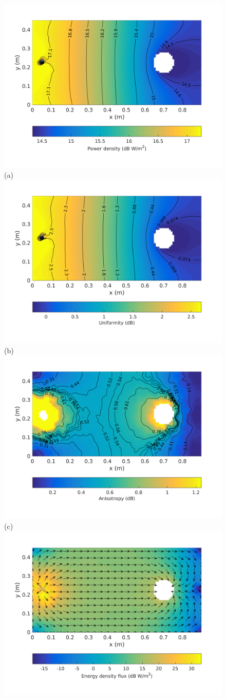 \documentclass[a4paper]{article}
\numberwithin{equation}{section}
\begin{document}
\begin{figure}[hp]
\begin{center}
\includegraphics[trim={0 8mm 0 12mm},clip,width=0.52\linewidth]{figures/SDM_3D_SL_PowerDensityMap}\\
{\footnotesize (a)}\\
\vspace{2mm}
\includegraphics[trim={0 8mm 0 12mm},clip,width=0.52\linewidth]{figures/SDM_3D_SL_EnergyDensityUniformityMap}\\
{\footnotesize (b)}\\
\vspace{2mm}
\includegraphics[trim={0 8mm 0 12mm},clip,width=0.52\linewidth]{figures/SDM_3D_SL_EnergyDensityAnisotropyMap}\\
{\footnotesize (c)}\\
\vspace{2mm}
\includegraphics[trim={0 8mm 0 12mm},clip,width=0.52\linewidth]{figures/SDM_3D_SL_EnergyDensityFluxMap}\\

\end{center}
\end{figure}
\end{document}

